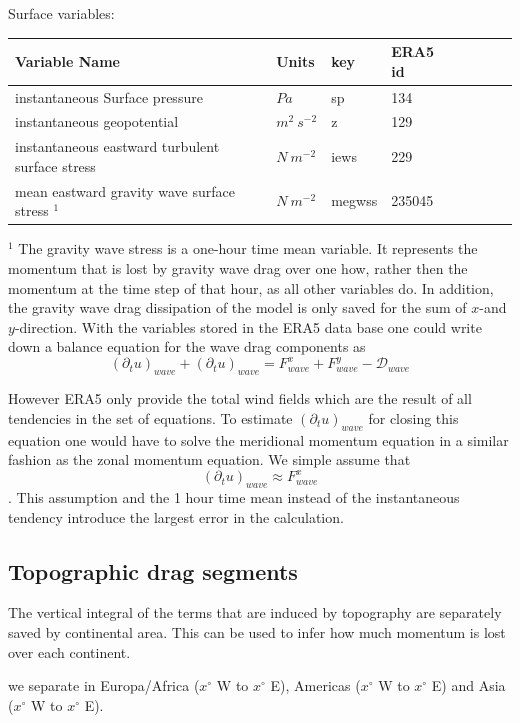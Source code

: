 \documentclass[11pt]{article}
\numberwithin{equation}{section}
\begin{document}
Surface variables:
\begin{table}[h!]
\label{table:srf_var}
\begin{center}
    \begin{tabular}{ | l | l | l | l | l | l | l | l |}
    \hline
    Variable Name & Units & key & ERA5 id  \\ \hline
    instantaneous Surface pressure & $Pa$   & sp    &  134 \\ \hline
    instantaneous geopotential & $m^2~s^{-2}$   & z    &  129 \\ \hline
    instantaneous eastward turbulent surface stress & $N~m^{-2}$   & iews  &  229 \\ \hline
    mean eastward gravity wave surface stress $^1$ & $N~m^{-2}$  & megwss  &  235045 \\ \hline
        \end{tabular}
\end{center}
\end{table}

\begingroup
    \fontsize{9pt}{11pt}\selectfont
$^1$ The gravity wave stress is a one-hour time mean variable. It represents the momentum that is lost by gravity wave drag over one how, rather then the momentum at the time step of that hour, as all other variables do. In addition, the gravity wave drag dissipation of the model is only saved for the sum of $x$-and $y$-direction. With the variables stored in the ERA5 data base one could write down a balance equation for the wave drag components as 
$$ \left(\partial_t u\right)_{wave} + \left(\partial_t u\right)_{wave} =  F^x_{wave} + F^y_{wave} - \mathcal{D}_{wave} $$

However ERA5 only provide the total wind fields which are the result of all tendencies in the set of equations. To estimate $\left(\partial_t u\right)_{wave}$ for closing this equation one would have to solve the meridional momentum equation in a similar fashion as the zonal momentum equation. We simple assume that
$$ \left(\partial_t u\right)_{wave}  \approx  F^x_{wave} $$.
This assumption and the 1 hour time mean instead of the instantaneous tendency introduce the largest error in the calculation.
\endgroup

\subsection{Topographic drag segments}
The vertical integral of the terms that are induced by topography are separately saved by continental area. This can be used to infer how much momentum is lost over each continent.\par
we separate in Europa/Africa ($x^\circ$ W to $x^\circ$ E), Americas ($x^\circ$ W to $x^\circ$ E) and Asia ($x^\circ$ W to $x^\circ$ E).\par
\end{document}
